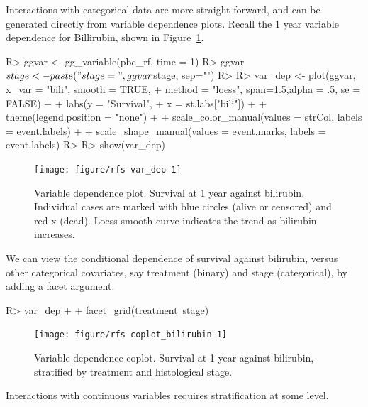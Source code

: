 \documentclass[nojss]{jss}\usepackage[]{graphicx}\usepackage[]{color}
\begin{document}
Interactions with categorical data are more straight forward, and can be generated directly from variable dependence plots. Recall the 1 year variable dependence for Billirubin, shown in Figure~\ref{fig:var_dep}. 
\begin{Schunk}
\begin{Sinput}
R> ggvar <- gg_variable(pbc_rf, time = 1)
R> ggvar$stage <- paste("stage=", ggvar$stage, sep="")
R> 
R> var_dep <- plot(ggvar, x_var = "bili", smooth = TRUE, 
+                 method = "loess", span=1.5,alpha = .5, se = FALSE) + 
+   labs(y = "Survival", 
+        x = st.labs["bili"]) + 
+   theme(legend.position = "none") + 
+   scale_color_manual(values = strCol, labels = event.labels) + 
+   scale_shape_manual(values = event.marks, labels = event.labels)
R> 
R> show(var_dep)
\end{Sinput}
\begin{figure}[!htpb]

{\centering \texttt{[image: figure/rfs-var\_dep-1]} 

}

\caption[Variable dependence plot]{Variable dependence plot. Survival at 1 year against bilirubin. Individual cases are marked with blue circles (alive or censored) and red x (dead). Loess smooth curve indicates the trend as bilirubin  increases.\label{fig:var_dep}}
\end{figure}
\end{Schunk}

We can view the conditional dependence of survival against bilirubin, versus other categorical covariates, say treatment (binary) and stage (categorical), by adding a facet argument.
\begin{Schunk}
\begin{Sinput}
R> var_dep + 
+   facet_grid(treatment~stage)
\end{Sinput}
\begin{figure}[!htpb]

{\centering \texttt{[image: figure/rfs-coplot\_bilirubin-1]} 

}

\caption[Variable dependence coplot]{Variable dependence coplot. Survival at 1 year against bilirubin, stratified by treatment and histological stage.\label{fig:coplot_bilirubin}}
\end{figure}
\end{Schunk}

Interactions with continuous variables requires stratification at some level.
\end{document}
